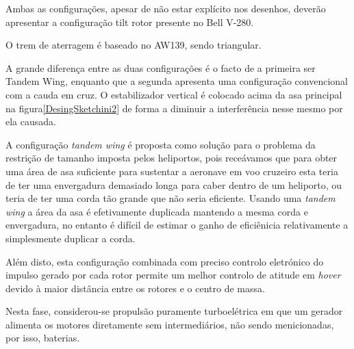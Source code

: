 Ambas as configurações, apesar de não estar explícito nos desenhos, deverão apresentar a configuração tilt rotor presente no Bell V-280.\par
O trem de aterragem é baseado no AW139, sendo triangular.\par
A grande diferença entre as duas configurações é o facto de a primeira ser Tandem Wing, enquanto que a segunda apresenta uma configuração convencional com a cauda em cruz. O estabilizador vertical é colocado acima da asa principal na figura\ref{DesingSketchini2} de forma a diminuir a interferência nesse mesmo por ela causada.\par
A configuração \textit{tandem wing} é proposta como solução para o problema da restrição de tamanho imposta pelos heliportos, pois receávamos que para obter uma área de asa suficiente para sustentar a aeronave em voo cruzeiro esta teria de ter uma envergadura demasiado longa para caber dentro de um heliporto, ou teria de ter uma corda tão grande que não seria eficiente. Usando uma \textit{tandem wing} a área da asa é efetivamente duplicada mantendo a mesma corda e envergadura, no entanto é difícil de estimar o ganho de eficiênicia relativamente a simplesmente duplicar a corda.\par
Além disto, esta configuração combinada com preciso controlo eletrónico do impulso gerado por cada rotor permite um melhor controlo de atitude em \textit{hover} devido à maior distância entre os rotores e o centro de massa.\par
Nesta fase, considerou-se propulsão puramente turboelétrica em que um gerador alimenta os motores diretamente sem intermediários, não sendo menicionadas, por isso, baterias.\par